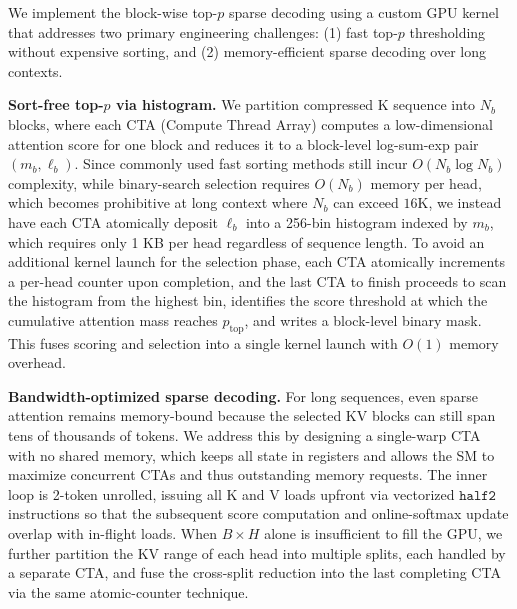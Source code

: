 We implement the block-wise top-$p$ sparse decoding using a custom GPU kernel that addresses two primary engineering challenges: (1) fast top-$p$ thresholding without expensive sorting, and (2) memory-efficient sparse decoding over long contexts.

\noindent\textbf{Sort-free top-\texorpdfstring{$p$}{p} via histogram.} 
We partition compressed K sequence into $N_b$ blocks, where each CTA (Compute Thread Array) computes a low-dimensional attention score for one block and reduces it to a block-level log-sum-exp pair $(m_b, \ell_b)$.
Since commonly used fast sorting methods still incur $O(N_b \log N_b)$ complexity, while binary-search selection requires $O(N_b)$ memory per head, which becomes prohibitive at long context where $N_b$ can exceed $16\text{K}$, we instead have each CTA atomically deposit $\ell_b$ into a 256-bin histogram indexed by $m_b$, which requires only 1 KB per head regardless of sequence length.
To avoid an additional kernel launch for the selection phase, each CTA atomically increments a per-head counter upon completion, and the last CTA to finish proceeds to scan the histogram from the highest bin, identifies the score threshold at which the cumulative attention mass reaches $p_\text{top}$, and writes a block-level binary mask.
This fuses scoring and selection into a single kernel launch with $O(1)$ memory overhead.


\noindent\textbf{Bandwidth-optimized sparse decoding.} 
For long sequences, even sparse attention remains memory-bound because the selected KV blocks can still span tens of thousands of tokens. We address this by designing a single-warp CTA with no shared memory, which keeps all state in registers and allows the SM to maximize concurrent CTAs and thus outstanding memory requests.
The inner loop is 2-token unrolled, issuing all K and V loads upfront via vectorized $\texttt{half2}$ instructions so that the subsequent score computation and online-softmax update overlap with in-flight loads.
When $B{\times}H$ alone is insufficient to fill the GPU, we further partition the KV range of each head into multiple splits, each handled by a separate CTA, and fuse the cross-split reduction into the last completing CTA via the same atomic-counter technique.

